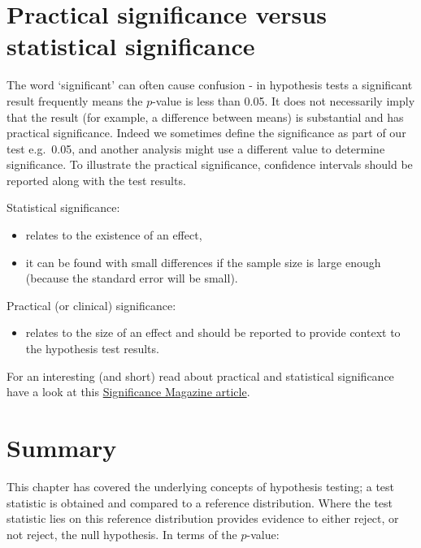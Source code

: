 \documentclass[
  oneside]{krantz}
\providecommand{\tightlist}{%
  \setlength{\itemsep}{0pt}\setlength{\parskip}{0pt}}
\begin{document}
\hypertarget{practical-significance-versus-statistical-significance}{%
\section{Practical significance versus statistical significance}\label{practical-significance-versus-statistical-significance}}

The word `significant' can often cause confusion - in hypothesis tests a significant result frequently means the \(p\)-value is less than 0.05. It does not necessarily imply that the result (for example, a difference between means) is substantial and has practical significance. Indeed we sometimes define the significance as part of our test e.g.~0.05, and another analysis might use a different value to determine significance. To illustrate the practical significance, confidence intervals should be reported along with the test results.

Statistical significance:

\begin{itemize}
\item
  relates to the existence of an effect,
\item
  it can be found with small differences if the sample size is large enough (because the standard error will be small).
\end{itemize}

Practical (or clinical) significance:

\begin{itemize}
\tightlist
\item
  relates to the size of an effect and should be reported to provide context to the hypothesis test results.
\end{itemize}

For an interesting (and short) read about practical and statistical significance have a look at this \href{https://www.statslife.org.uk/the-statistics-dictionary/1000-the-statistics-dictionary-significantly-misleading}{Significance Magazine article}.

\hypertarget{SUMhyp}{%
\section{Summary}\label{SUMhyp}}

This chapter has covered the underlying concepts of hypothesis testing; a test statistic is obtained and compared to a reference distribution. Where the test statistic lies on this reference distribution provides evidence to either reject, or not reject, the null hypothesis. In terms of the \(p\)-value:
\end{document}
